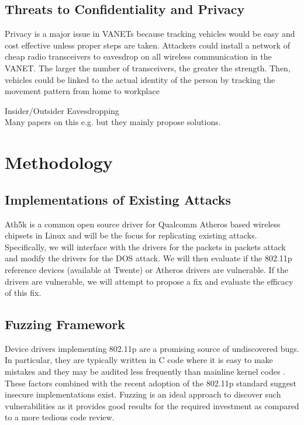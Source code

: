\documentclass[conference]{IEEEtran}
\begin{document}
\subsection{Threats to Confidentiality and Privacy}

Privacy is a major issue in VANETs because tracking vehicles would be easy and cost effective unless proper steps are taken. Attackers could install a network of cheap radio transceivers to eavesdrop on all wireless communication in the VANET. The larger the number of transceivers, the greater the strength. Then, vehicles could be linked to the actual identity of the person by tracking the movement pattern from home to workplace \cite{toor2008vehicle}

Insider/Outsider Eavesdropping \cite{laurendeau2006threats}\\

Many papers on this e.g. \cite{dotzer2006privacy} but they mainly propose solutions.

\section{Methodology}
\subsection{ Implementations of Existing Attacks}
\label{sec:existing_attacks}
Ath5k is a common open source driver for Qualcomm Atheros based wireless chipsets in Linux and will be the focus for replicating existing attacks. Specifically, we will interface with the drivers for the packets in packets attack and modify the drivers for the DOS attack. We will then evaluate if the 802.11p reference devices (available at Twente) or Atheros drivers are vulnerable. If the drivers are vulnerable, we will attempt to propose a fix and evaluate the efficacy of this fix.\\

\subsection{Fuzzing Framework}
Device drivers implementing 802.11p are a promising source of undiscovered bugs. In particular, they are typically written in C code where it is easy to make mistakes and they may be audited less frequently than mainline kernel codes \cite{butti2008discovering}. These factors combined with the recent adoption of the 802.11p standard suggest insecure implementations exist. Fuzzing is an ideal approach to discover such vulnerabilities as it provides good results for the required investment as compared to a more tedious code review.\\
\end{document}
